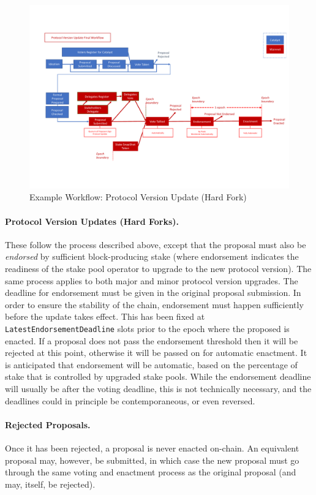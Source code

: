\begin{figure}
  \includegraphics[trim=0 90 0 80,clip,width=\textwidth]{Workflow2}
  \caption{Example Workflow: Protocol Version Update (Hard Fork)}
  \label{fig:workflow-hf}
\end{figure}

\paragraph{Protocol Version Updates (Hard Forks).}  These follow the process described above,
except that the proposal must also be \emph{endorsed} by sufficient block-producing stake
(where endorsement indicates the readiness of the stake pool operator to upgrade to the new protocol version).
The same process applies to both major and minor protocol version upgrades.
The deadline for endorsement must be given in the original proposal submission.
In order to ensure the stability of the chain, endorsement must happen sufficiently before the update takes
effect.  This has been fixed at \texttt{LatestEndorsementDeadline} slots prior to the epoch where the proposed is enacted.
If a proposal does not pass the endorsement threshold then it will be rejected at this point, otherwise it will be
passed on for automatic enactment.  It is anticipated that endorsement will be automatic, based on the percentage of stake that
is controlled by upgraded stake pools.
While the endorsement deadline will usually be after the voting deadline, this is not technically necessary, and the deadlines could
in principle be contemporaneous, or even reversed.

\paragraph{Rejected Proposals.}   Once it has been rejected, a proposal is never enacted on-chain.
An equivalent proposal may, however, be submitted, in which case the new proposal must go through the same voting and enactment process
as the original proposal (and may, itself, be rejected).
